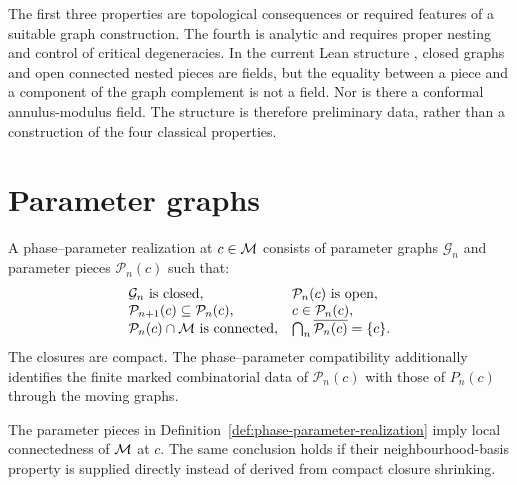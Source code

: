 The first three properties are topological consequences or required
features of a suitable graph construction.  The fourth is analytic and
requires proper nesting and control of critical degeneracies.
In the current Lean structure , closed
graphs and open connected nested pieces are fields, but the equality
between a piece and a component of the graph complement is not a field.
Nor is there a conformal annulus-modulus field.  The structure is
therefore preliminary data, rather than a construction of the four
classical properties.


\section{Parameter graphs}

\begin{definition}
\label{def:phase-parameter-realization}
A phase--parameter realization at $c\in\mathcal M$ consists of parameter graphs
$\mathcal G_n$ and parameter pieces $\mathcal P_n(c)$ such that:
\[
\begin{array}{ll}
\mathcal G_n\text{ is closed},&
\mathcal P_n(c)\text{ is open},\\
\mathcal P_{n+1}(c)\subseteq\mathcal P_n(c),&
c\in\mathcal P_n(c),\\
\mathcal P_n(c)\cap\mathcal M\text{ is connected},&
\bigcap_n\overline{\mathcal P_n(c)}=\{c\}.
\end{array}
\]
The closures are compact.  The phase--parameter compatibility
additionally identifies the finite marked combinatorial data of
$\mathcal P_n(c)$ with those of $P_n(c)$ through the moving graphs.
\end{definition}

\begin{theorem}
\label{thm:topological-transport}
The parameter pieces in
Definition~\ref{def:phase-parameter-realization} imply local
connectedness of $\mathcal M$ at $c$.  The same conclusion holds if their
neighbourhood-basis property is supplied directly instead of derived
from compact closure shrinking.
\end{theorem}

